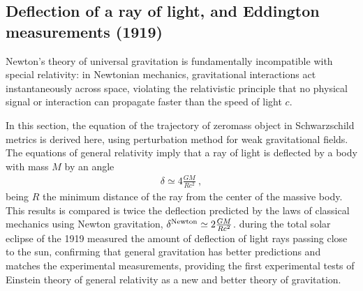 \documentclass[letterpaper,10pt,english]{jupyterBook}
\begin{document}
\subsection{Deflection of a ray of light, and Eddington measurements (1919)}
\label{\detokenize{ch/relativity-general/rays-of-light-deflection:deflection-of-a-ray-of-light-and-eddington-measurements-1919}}\label{\detokenize{ch/relativity-general/rays-of-light-deflection:relativity-general-notes-examples-deflection-of-ray-of-light}}\label{\detokenize{ch/relativity-general/rays-of-light-deflection::doc}}
\sphinxAtStartPar
Newton’s theory of universal gravitation is fundamentally incompatible with special relativity: in Newtonian mechanics, gravitational interactions act instantaneously across space, violating the relativistic principle that no physical signal or interaction can propagate faster than the speed of light \(c\).

\sphinxAtStartPar
In this section, the equation of the trajectory of zero\sphinxhyphen{}mass object in Schwarzschild metrics is derived here, using perturbation method for weak gravitational fields. The equations of general relativity imply that a ray of light is deflected by a body with mass \(M\) by an angle
\begin{equation*}
\begin{split}\delta \simeq 4 \frac{GM}{R c^2} \ ,\end{split}
\end{equation*}
\sphinxAtStartPar
being \(R\) the minimum distance of the ray from the center of the massive body. This results is compared is twice the deflection predicted by the laws of classical mechanics using Newton gravitation, \(\delta^{\rm Newton} \simeq 2 \frac{GM}{R c^2}\).  during the total solar eclipse of the 1919 measured the amount of deflection of light rays passing close to the sun, confirming that general gravitation has better predictions and matches the experimental measurements, providing the first experimental tests of Einstein theory of general relativity as a new and better theory of gravitation.
\end{document}
